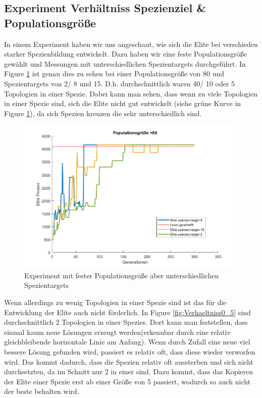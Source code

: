 \documentclass{hbrs-ecta-report}
\begin{document}
\subsection{Experiment Verhältniss Spezienziel \& Populationsgröße}
In einem Experiment haben wir uns angeschaut, wie sich die Elite bei verschieden starker Spezienbildung entwickelt. Dazu haben wir eine feste Populationsgröße gewählt und Messungen mit unterschiedlichen Spezientargets durchgeführt. In Figure \ref{fig:Spezien} ist genau dies zu sehen bei einer Populationsgröße von 80 und Spezientargets von 2/ 8 und 15. D.h. durchschnittlich waren 40/ 10 oder 5 Topologien in einer Spezie. Dabei kann man sehen, dass wenn zu viele Topologien in einer Spezie sind, sich die Elite nicht gut entwickelt (siehe grüne Kurve in Figure \ref{fig:Spezien}), da sich Spezien kreuzen die sehr unterschiedlich sind. \\
\begin{figure}[ht!]
\centering
\includegraphics[width=\linewidth]{img/Mario_80_Netze_gesamt.png}
\caption{Experiment mit fester Populationsgröße aber unterschiedlichen Spezientargets}
\label{fig:Spezien} 
\end{figure}

Wenn allerdings zu wenig Topologien in einer Spezie sind ist das für die Entwicklung der Elite auch nicht förderlich. In Figure \ref{fig:Verhaeltniss0_5} sind durchschnittlich 2 Topologien in einer Spezies. Dort kann man feststellen, dass einmal kaum neue Lösungen erzeugt werden(erkennbar durch eine relativ gleichbleibende horizontale Linie am Anfang). Wenn durch Zufall eine neue viel bessere Lösung gefunden wird, passiert es relativ oft, dass diese wieder verworfen wird. Das kommt dadurch, dass die Spezien relativ oft aussterben und sich nicht durchsetzten, da im Schnitt nur 2 in einer sind. Dazu kommt, dass das Kopieren der Elite einer Spezie erst ab einer Größe von 5 passiert, wodurch so auch nicht der beste behalten wird.\\
 
\end{document}
